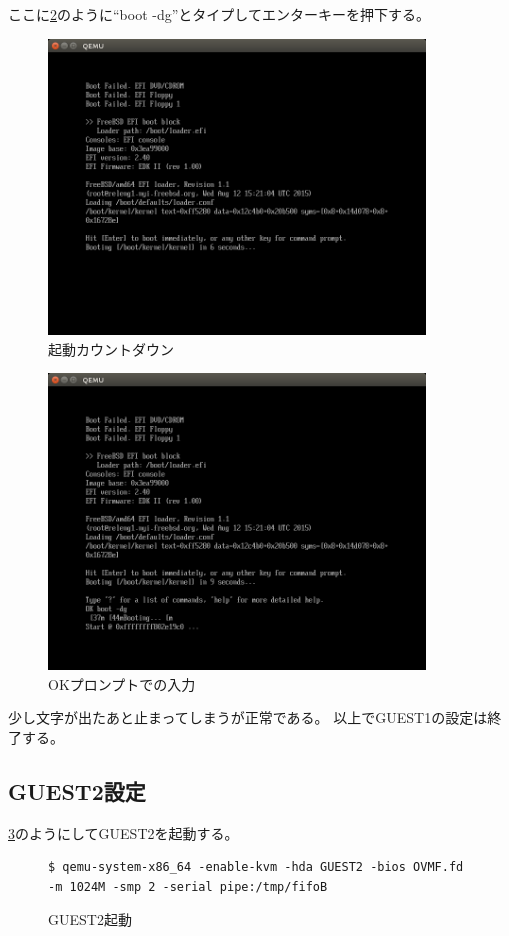 \documentclass[a4j]{jarticle}
\begin{document}
ここに\ref{fig:FreeBSD_OK}のように``boot -dg''とタイプしてエンターキーを押下する。
\begin{figure}[htbp]
	\centering
	\includegraphics[width=10cm]{./IMG/FreeBSD_CNTDN.png}
    \caption{起動カウントダウン}
    \label{fig:FreeBSD_CNTDN}
\end{figure}
\begin{figure}[htbp]
	\centering
	\includegraphics[width=10cm]{./IMG/FreeBSD_OK.png}
    \caption{OKプロンプトでの入力}
    \label{fig:FreeBSD_OK}
\end{figure}
少し文字が出たあと止まってしまうが正常である。
以上でGUEST1の設定は終了する。

\subsection{GUEST2設定}
\ref{fig:FreeBSD_guest2}のようにしてGUEST2を起動する。
\begin{figure}[htbp]
	\centering
	\begin{lstlisting}[basicstyle=\ttfamily\footnotesize, frame=single, breaklines=true]
$ qemu-system-x86_64 -enable-kvm -hda GUEST2 -bios OVMF.fd -m 1024M -smp 2 -serial pipe:/tmp/fifoB
	\end{lstlisting}
	\caption{GUEST2起動}
	\label{fig:FreeBSD_guest2}
\end{figure}
\end{document}
